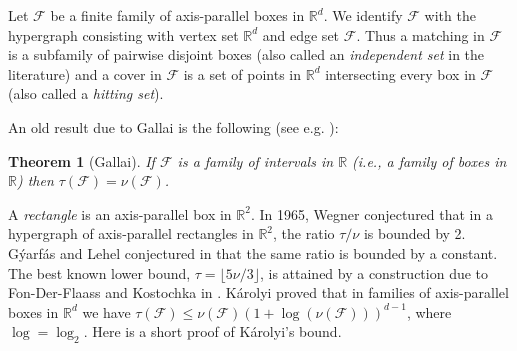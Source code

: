 \documentclass[12pt]{amsart}
\theoremstyle{plain}
\newtheorem{theorem}{Theorem}[section]
\theoremstyle{definition}
\theoremstyle{remark}
\newcommand{\F}{\mathcal{F}}
\newcommand{\R}{\mathbb{R}}
\begin{document}
Let $\F$ be a finite family of axis-parallel boxes in $\R^d$. We identify $\F$ with the hypergraph consisting with vertex set $\R^d$ and 
 edge set $\F$. Thus a matching in $\F$ is a subfamily of pairwise disjoint boxes (also called an {\em independent set} in the literature) and a cover in $\F$ is a set of points in $\R^d$ intersecting every box in $\F$ (also called a {\em hitting set}).  
 
An old result due to Gallai is the following (see e.g. \cite{hajnalsuranyi}): 
\begin{theorem}[Gallai]\label{thm:gallai} 
If $\F$ is a family of intervals in $\R$ (i.e., a family of boxes in $\R$) then $\tau(\F) = \nu(\F)$.
\end{theorem} 

A \emph{rectangle} is an axis-parallel box in $\R^2$. In 1965, Wegner \cite{wegner} conjectured that in a hypergraph of axis-parallel rectangles in $\R^2$, the ratio $\tau/\nu$ is bounded by 2. G\'{y}arf\'{a}s and Lehel conjectured in \cite{gyarfaslehel} that the same ratio is bounded by a constant. The best known lower bound, $\tau = \lfloor 5 \nu/3 \rfloor$, is attained by a construction due to Fon-Der-Flaass and Kostochka in \cite{fonderflaass}. K{\'a}rolyi \cite{karolyi} proved that in families of axis-parallel boxes in $\R^d$ we have $\tau(\F) \leq \nu(\F) \left(1 + \log\left(\nu(\F)\right)\right)^{d-1}$, where $\log=\log_2$. Here is a short proof of K{\'a}rolyi's bound.
\end{document}
